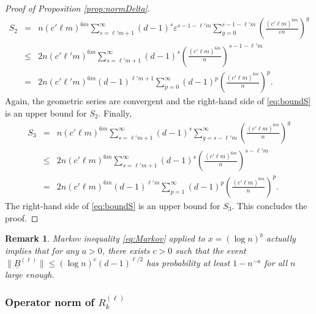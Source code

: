 \documentclass[11pt]{article}
\newtheorem{remark}{Remark}
\newcommand{\PAR}[1]{{{\left(#1\right)}}} %
\newcommand{\uB}{{\underline B}}
\newcommand{\1}{1\!\!{\sf I}}\newcommand{\IND}{\1}
\newcommand{\veps}{\varepsilon}
\begin{document}
\begin{proof}[Proof of Proposition \ref{prop:normDelta}]
\begin{eqnarray*}
S_2 & =  &   n   (c'  \ell  m)^{6 m}  \sum_{s= \ell' m+1}^{\infty} (d-1)^{s} \veps^{s-1 -\ell' m} \sum_{g = 0} ^{s - 1 - \ell' m } \PAR{\frac{(c' \ell m) ^{6m}  }{ \veps n } }^{g} \\
& \leq & 2 n (c' \ell'  m )^{6 m}     \sum_{s = \ell' m+1}^{ \infty} (d-1)^{s}   \PAR{\frac{(c' \ell m) ^{6m} }{ n } }^{ s- 1 - \ell'm} \\
& = & 2 n (c' \ell'  m )^{6 m}  (d-1)^{\ell 'm+1}\sum_{p = 0}^{ \infty} (d-1)^{p}   \PAR{\frac{ (c' \ell m) ^{6m} }{ n } }^{ p}.
\end{eqnarray*}
Again, the geometric series are convergent and the right-hand side of \eqref{eq:boundS} is an upper bound for $S_2$. Finally, 
\begin{eqnarray*}
S_3 & =  &  n   (c'  \ell  m)^{6 m}  \sum_{s= \ell'm+1}^{\infty} (d-1)^s  \sum_{g = s - \ell'm }^{\infty}  \PAR{\frac{ (c' \ell m) ^{6m} }{ n } }^{g} \\
& \leq & 2 n   (c'  \ell  m)^{6 m}    \sum_{s = \ell'm+1}^{ \infty} (d-1)^{s}   \PAR{\frac{  (c' \ell m) ^{6m}  }{ n } }^{ s - \ell'm} \\
& = & 2 n   (c'  \ell  m)^{6 m} (d-1)^{\ell'm}\sum_{p = 1}^{ \infty} (d-1)^{p}   \PAR{\frac{ (c' \ell m) ^{6m} }{ n } }^{ p}.
\end{eqnarray*}
The right-hand side of \eqref{eq:boundS} is an upper bound for $S_3$. This concludes the proof. 
\end{proof}




\begin{remark}\label{rk:QB} Markov inequality \eqref{eq:Markov} applied to $x = (\log n)^b$ actually implies that for any $a >0$, there exists $c >0$ such that the event $ \| \uB^{(\ell)} \| \leq  ( \log n) ^{c} \PAR{ d -1} ^{\ell /2}$ has probability at least $1 - n^{-a}$ for all $n$ large enough.
\end{remark}
\subsubsection{Operator norm of $R^{(\ell)}_{k}$}
\end{document}

